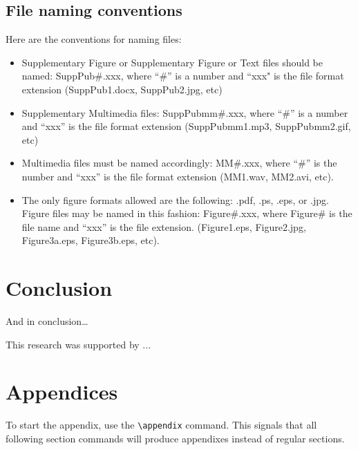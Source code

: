 \documentclass[preprint]{JASA}
\begin{document}
\subsection{File naming conventions}
Here are the conventions for naming files:

\begin{itemize}
\item
Supplementary Figure or
	Supplementary Figure or Text files should be named: SuppPub\#.xxx, where ``\#'' is
	a number and ``xxx" is the file format extension
	(SuppPub1.docx, SuppPub2.jpg, etc)

\item
	Supplementary Multimedia files: SuppPubmm\#.xxx, where ``\#'' is a
	number and ``xxx'' is the file format extension (SuppPubmm1.mp3,
	SuppPubmm2.gif, etc)

\item
Multimedia files must be named accordingly: MM\#.xxx, where ``\#'' is the
number and ``xxx'' is the file format extension (MM1.wav, MM2.avi, etc).

\item
The only figure formats allowed are the following: 
.pdf, .ps, .eps, or .jpg. Figure files may be named in this fashion:
Figure\#.xxx, where Figure\# is the file name and ``xxx'' is the file
extension. (Figure1.eps, Figure2.jpg, Figure3a.eps, Figure3b.eps, etc).  

\end{itemize}


\section{\label{sec:5}Conclusion}

And in conclusion\ldots

\begin{acknowledgments}
This research was supported by  ...
\end{acknowledgments}



\section{Appendices}

To start the appendix, use the \verb+\appendix+ command.
This signals that all following section commands will produce appendixes
instead of regular sections. 
\end{document}
